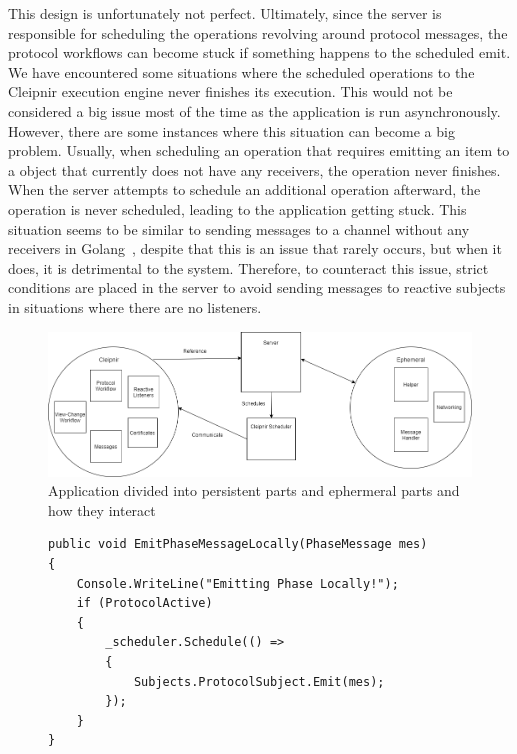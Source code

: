 This design is unfortunately not perfect. Ultimately, since the server is responsible for scheduling the operations revolving around protocol messages, the protocol workflows can become stuck if something happens to the scheduled emit. We have encountered some situations where the scheduled operations to the Cleipnir execution engine never finishes its execution. This would not be considered a big issue most of the time as the application is run asynchronously. However, there are some instances where this situation can become a big problem. Usually, when scheduling an operation that requires emitting an item to a  object that currently does not have any receivers, the operation never finishes. When the server attempts to schedule an additional operation afterward, the operation is never scheduled, leading to the application getting stuck. This situation seems to be similar to sending messages to a channel without any receivers in Golang~\cite{WEB:golangChannels}, despite that this is an issue that rarely occurs, but when it does, it is detrimental to the system. Therefore, to counteract this issue, strict conditions are placed in the server to avoid sending messages to reactive subjects in situations where there are no listeners.

\begin{figure}[H]
	\includegraphics[width=\linewidth]{figures/CleipnirStructure}
	\caption{Application divided into persistent parts and ephermeral parts and how they interact}
	\label{fig:PersistencyEphemeral}
\end{figure}

\begin{figure}[h]
	\centering
	\begin{lstlisting}[label = code:schedulerEmit, caption= Example of server and protocol interaction using Cleipnir scheduler, captionpos=b, basicstyle=\scriptsize]
public void EmitPhaseMessageLocally(PhaseMessage mes)
{
    Console.WriteLine("Emitting Phase Locally!");
    if (ProtocolActive)
    {
        _scheduler.Schedule(() =>
        {
            Subjects.ProtocolSubject.Emit(mes);
        });   
    }
}
	\end{lstlisting}
\end{figure}
